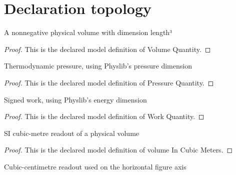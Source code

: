 \section{Declaration topology}
\begin{definition}
  \label{def:physics:phyx-mini-0418:phyxminiproblems-problemphyxmini0418-volumequantity}
  A nonnegative physical volume with dimension length³
\end{definition}
\begin{proof}
  This is the declared model definition of Volume Quantity.
\end{proof}
\begin{definition}
  \label{def:physics:phyx-mini-0418:phyxminiproblems-problemphyxmini0418-pressurequantity}
  Thermodynamic pressure, using Physlib's pressure dimension
\end{definition}
\begin{proof}
  This is the declared model definition of Pressure Quantity.
\end{proof}
\begin{definition}
  \label{def:physics:phyx-mini-0418:phyxminiproblems-problemphyxmini0418-workquantity}
  Signed work, using Physlib's energy dimension
\end{definition}
\begin{proof}
  This is the declared model definition of Work Quantity.
\end{proof}
\begin{definition}
  \label{def:physics:phyx-mini-0418:phyxminiproblems-problemphyxmini0418-volumeincubicmeters}
  SI cubic-metre readout of a physical volume
\end{definition}
\begin{proof}
  This is the declared model definition of volume In Cubic Meters.
\end{proof}
\begin{definition}
  \label{def:physics:phyx-mini-0418:phyxminiproblems-problemphyxmini0418-volumeincubiccentimeters}
  Cubic-centimetre readout used on the horizontal figure axis
\end{definition}
